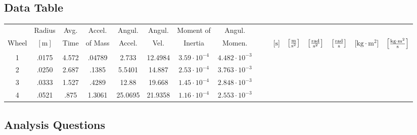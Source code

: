 \documentclass{article}
\begin{document}
\subsection{Data Table}
\begin{center}
\begin{tabular}{|c|c|c|c|c|c|c|c|}
\hline
& Radius & Avg. & Accel. & Angul. & Angul. & Moment of & Angul.\\ 
Wheel & $[\si{\meter}]$  & Time & of Mass & Accel. & Vel. & Inertia & Momen.
 & & &  [$\si{\second}$] &  $\left[\si{\frac{\meter}{\square\second}} \right]$ &  $\left[\si{\frac{\radian}{\square\second}} \right]$ & $\left[\si{\frac{\radian}{\second}}\right]$ & [$\si{\kilo\gram\cdot\square\meter}$] & $\left[\si{\frac{\kilogram\cdot\square\meter}{\second}}\right]$\\
  & .0175 & 4.572 & .04789 & 2.733 & 12.4984 & $3.59 \cdot 10^{-4}$ & $4.482 \cdot 10^{-3}$\\
     & .0250 & 2.687 & .1385 & 5.5401 & 14.887 & $2.53 \cdot 10^{-4}$ & $3.763 \cdot 10^{-3}$\\
     & .0333 & 1.527 & .4289 & 12.88 & 19.668 & $1.45 \cdot 10^{-4}$ & $2.848 \cdot 10^{-3}$\\
     & .0521 & .875 & 1.3061 & 25.0695 & 21.9358 & $1.16 \cdot 10^{-4}$ & $2.553 \cdot 10^{-3}$\\
    \hline
\end{tabular}
\end{center}
\subsection{Analysis Questions}
\end{document}
